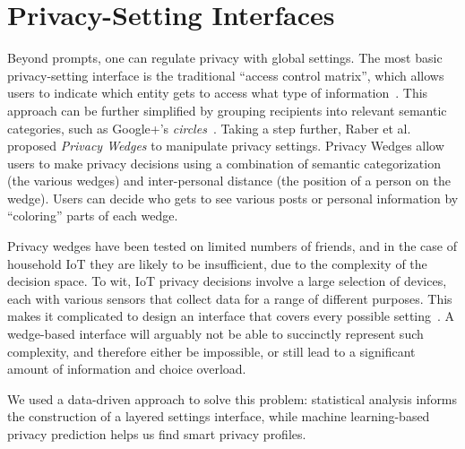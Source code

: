 
\section{Privacy-Setting Interfaces}
Beyond prompts, one can regulate privacy with global settings. The most basic privacy-setting interface is the traditional ``access control matrix'', which allows users to indicate which entity gets to access what type of information~\cite{sandhu1994access}. This approach can be further simplified by grouping recipients into relevant semantic categories, such as Google+'s \emph{circles}~\cite{watson12}. Taking a step further, Raber et al.~\cite{197908} proposed \emph{Privacy Wedges} to manipulate privacy settings. Privacy Wedges allow users to make privacy decisions using a combination of semantic categorization (the various wedges) and inter-personal distance (the position of a person on the wedge). Users can decide who gets to see various posts or personal information by ``coloring'' parts of each wedge. 

Privacy wedges have been tested on limited numbers of friends, and in the case of household IoT they are likely to be insufficient, due to the complexity of the decision space. To wit, IoT privacy decisions involve a large selection of devices, each with various sensors that collect data for a range of different purposes. This makes it complicated to design an interface that covers every possible setting~\cite{williams2016perfect}. A wedge-based interface will arguably not be able to succinctly represent such complexity, and therefore either be impossible, or still lead to a significant amount of information and choice overload. 

We used a data-driven approach to solve this problem: statistical analysis informs the construction of a layered settings interface, while machine learning-based privacy prediction helps us find smart privacy profiles.

